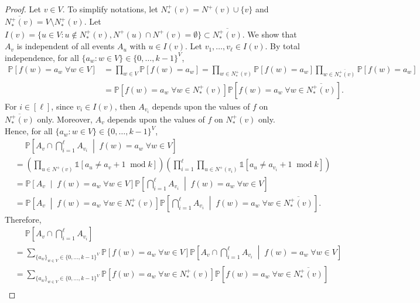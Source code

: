 \documentclass[letterpaper, reqno,11pt]{article}
\newcommand{\PP}{\mathbb{P}}
\DeclareMathOperator{\Mod}{mod}
\begin{document}
\begin{enumerate}
\begin{proof}
    Let $v \in V$. To simplify notations, let $N_*^+(v) = N^+(v) \cup \{ v \}$ and $\overline{N_*^+(v)} = V \setminus N_*^+(v)$. Let $I(v) = \{ u \in V : u \not \in N_*^+(v), N^+(u) \cap N^+(v) = \emptyset \} \subset \overline{N_*^+(v)}$. We show that $A_v$ is independent of all events $A_u$ with $u \in I(v)$. Let $v_1, \ldots, v_\ell \in I(v)$. By total independence, for all $\{ a_w : w \in V \} \in \{ 0, \ldots, k - 1 \}^V$,
    \begin{align*}
      \PP\left[f(w) = a_w \;\forall w \in V \right] &= \prod_{w \in V} \PP\left[f(w) = a_w\right] = \prod_{w \in N_*^+(v)} \PP\left[f(w) = a_w\right] \prod_{w \in \overline{N_*^+(v)}} \PP\left[f(w) = a_w\right] \\
      &= \PP\left[f(w) = a_w \;\forall w \in N_*^+(v)\right] \PP\left[f(w) = a_w \;\forall w \in \overline{N_*^+(v)}\right].
    \end{align*}
    For $i \in [\ell]$, since $v_i \in I(v)$, then $A_{v_i}$ depends upon the values of $f$ on $\overline{N_*^+(v)}$ only. Moreover, $A_v$ depends upon the values of $f$ on $N_*^+(v)$ only. Hence, for all $\{ a_w : w \in V \} \in \{ 0, \ldots, k - 1 \}^V$,
    \begin{align*}
      &\quad\; \PP\left[A_v \cap \bigcap_{i = 1}^\ell A_{v_i} \;\middle|\; f(w) = a_w \;\forall w \in V\right] \\
      &= \left(\prod_{u \in N^+(v)} \mathds 1[a_u \neq a_v + 1 \;\Mod{k}]\right) \left(\prod_{i = 1}^\ell \prod_{u \in N^+\left(v_i\right)} \mathds 1\left[a_u \neq a_{v_i} + 1 \;\Mod{k}\right]\right) \\
      &= \PP\left[A_v \;\middle|\; f(w) = a_w \;\forall w \in V\right] \PP\left[\bigcap_{i = 1}^\ell A_{v_i} \;\middle|\; f(w) = a_w \;\forall w \in V\right] \\
      &= \PP\left[A_v \;\middle|\; f(w) = a_w \;\forall w \in N_*^+(v)\right] \PP\left[\bigcap_{i = 1}^\ell A_{v_i} \;\middle|\; f(w) = a_w \;\forall w \in \overline{N_*^+(v)}\right].
    \end{align*}
    Therefore,
    \begin{align*}
      &\quad\; \PP\left[A_v \cap \bigcap_{i = 1}^\ell A_{v_i}\right] \\
      &= \sum_{\{ a_w \}_{w \in V} \in \{ 0, \ldots, k - 1 \}^V} \PP\left[f(w) = a_w \;\forall w \in V\right] \PP\left[A_v \cap \bigcap_{i = 1}^\ell A_{v_i} \;\middle|\; f(w) = a_w \;\forall w \in V\right] \\
      &= \sum_{\{ a_w \}_{w \in V} \in \{ 0, \ldots, k - 1 \}^V} \PP\left[f(w) = a_w \;\forall w \in N_*^+(v)\right] \PP\left[f(w) = a_w \;\forall w \in \overline{N_*^+(v)}\right] \\

\end{align*}
\end{proof}
\end{enumerate}
\end{document}
